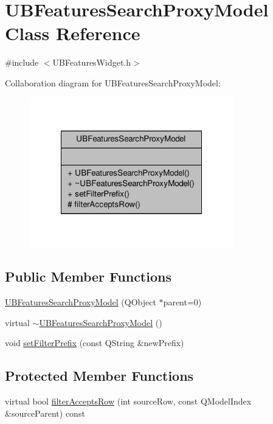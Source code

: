 \hypertarget{class_u_b_features_search_proxy_model}{\section{U\-B\-Features\-Search\-Proxy\-Model Class Reference}
\label{da/dcd/class_u_b_features_search_proxy_model}
}


{\ttfamily \#include $<$U\-B\-Features\-Widget.\-h$>$}



Collaboration diagram for U\-B\-Features\-Search\-Proxy\-Model\-:
\nopagebreak
\begin{figure}[H]
\begin{center}
\leavevmode
\includegraphics[width=252pt]{d4/df8/class_u_b_features_search_proxy_model__coll__graph}
\end{center}
\end{figure}
\subsection*{Public Member Functions}
\begin{DoxyCompactItemize}
\item 
\hyperlink{class_u_b_features_search_proxy_model_a1a1995b07d935848814e6be2c603e252}{U\-B\-Features\-Search\-Proxy\-Model} (Q\-Object $\ast$parent=0)
\item 
virtual \hyperlink{class_u_b_features_search_proxy_model_ac7df0c4938486d6314eac0760eb0bb9d}{$\sim$\-U\-B\-Features\-Search\-Proxy\-Model} ()
\item 
void \hyperlink{class_u_b_features_search_proxy_model_a256247b4ca7405eed0ff5610d4a5baef}{set\-Filter\-Prefix} (const Q\-String \&new\-Prefix)
\end{DoxyCompactItemize}
\subsection*{Protected Member Functions}
\begin{DoxyCompactItemize}
\item 
virtual bool \hyperlink{class_u_b_features_search_proxy_model_a27a7dc95b8122cff2d3d58991facb21b}{filter\-Accepts\-Row} (int source\-Row, const Q\-Model\-Index \&source\-Parent) const 
\end{DoxyCompactItemize}


